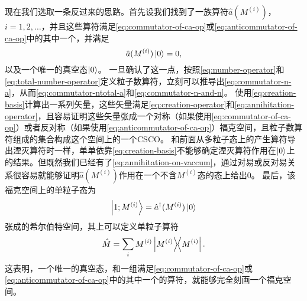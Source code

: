 \documentclass[hyperref, UTF8, a4paper]{ctexart}
\begin{document}
现在我们选取一条反过来的思路。首先设我们找到了一族算符$\hat{a}(M^{(i)})$，$i=1, 2, \ldots$，并且这些算符满足\eqref{eq:commutator-of-ca-op}或\eqref{eq:anticommutator-of-ca-op}中的其中一个，并满足
\begin{equation}
    \hat{a}(M^{(i)}) \ket{0} = 0,
    \label{eq:annihitation-on-vaccum}
\end{equation}
以及一个唯一的真空态$\ket{0}$。
一旦确认了这一点，按照\eqref{eq:number-operator}和\eqref{eq:total-number-operator}定义粒子数算符，立刻可以推导出\eqref{eq:commutator-n-a}，从而\eqref{eq:commutator-ntotal-a}和\eqref{eq:commutator-n-and-n}。
使用\eqref{eq:creation-basis}计算出一系列矢量，这些矢量满足\eqref{eq:creation-operator}和\eqref{eq:annihitation-operator}，且容易证明这些矢量张成一个对称（如果使用\eqref{eq:commutator-of-ca-op}）或者反对称（如果使用\eqref{eq:anticommutator-of-ca-op}）福克空间，且粒子数算符组成的集合构成这个空间上的一个CSCO。
和前面从多粒子态上的产生算符导出湮灭算符时一样，单单依靠\eqref{eq:creation-basis}不能够确定湮灭算符作用在$\ket{0}$上的结果。但既然我们已经有了\eqref{eq:annihitation-on-vaccum}，通过对易或反对易关系很容易就能够证明$\hat{a}(M^{(i)})$作用在一个不含$M^{(i)}$态的态上给出$0$。
最后，该福克空间上的单粒子态为
\begin{equation}
    \ket{1;M^{(i)}} = \hat{a}^\dagger (M^{(i)}) \ket{0}
\end{equation}
张成的希尔伯特空间，其上可以定义单粒子算符
\begin{equation}
    \hat{M} = \sum_i M^{(i)} \dyad{M^{(i)}}.
\end{equation}
这表明，一个唯一的真空态，和一组满足\eqref{eq:commutator-of-ca-op}或\eqref{eq:anticommutator-of-ca-op}中的其中一个的算符，就能够完全刻画一个福克空间。
\end{document}
